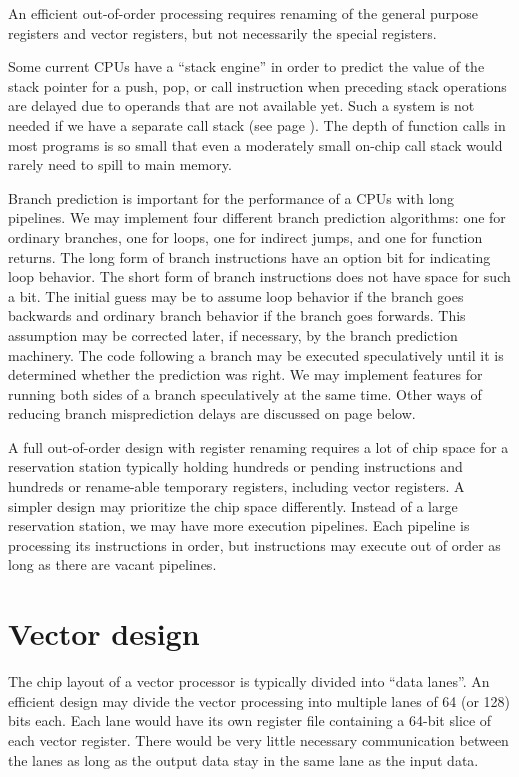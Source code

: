 \documentclass[forwardcom.tex]{subfiles}
\begin{document}
An efficient out-of-order processing requires renaming of the general purpose registers and vector registers, but not necessarily the special registers. 
\vv

Some current CPUs have a ``stack engine'' in order to predict the value of the stack pointer for a push, pop, or call instruction when preceding stack operations are delayed due to operands that are not available yet. Such a system is not needed if we have a separate call stack (see page \pageref{callStackImplementation}). The depth of function calls in most programs is so small that even a moderately small on-chip call stack would rarely need to spill to main memory.
\vv

Branch prediction is important for the performance of a CPUs with long pipelines. We may implement four different branch prediction algorithms: one for ordinary branches, one for loops, one for indirect jumps, and one for function returns. The long form of branch instructions have an option bit for indicating loop behavior. The short form of branch instructions does not have space for such a bit. The initial guess may be to assume loop behavior if the branch goes backwards and ordinary branch behavior if the branch goes forwards. This assumption may be corrected later, if necessary, by the branch prediction machinery. The code following a branch may be executed speculatively until it is determined whether the prediction was right. We may implement features for running both sides of a branch speculatively at the same time. Other ways of reducing branch misprediction delays are discussed on page \pageref{branchProposal} below.
\vv

A full out-of-order design with register renaming requires a lot of chip space for a reservation station typically holding hundreds or pending instructions and hundreds or rename-able temporary registers, including vector registers. A simpler design may prioritize the chip space differently. Instead of a large reservation station, we may have more execution pipelines. Each pipeline is processing its instructions in order, but instructions may execute out of order as long as there are vacant pipelines. 
\vv


\section{Vector design}\label{vectorDesign}
The chip layout of a vector processor is typically divided into ``data lanes''. 
An efficient design may divide the vector processing into multiple lanes of 64 (or 128) bits each. Each lane would have its own register file containing a 64-bit slice of each vector register. There would be very little necessary communication between the lanes as long as the output data stay in the same lane as the input data. 
\vv
\end{document}
